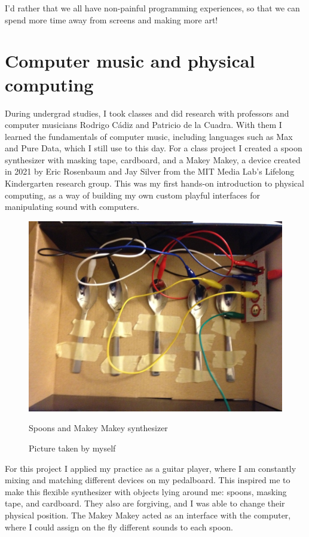 I'd rather that we all have non-painful programming experiences, so that we can spend more time away from screens and making more art!

\section{Computer music and physical computing}

During undergrad studies, I took classes and did research with professors and computer musicians Rodrigo Cádiz and Patricio de la Cuadra. With them I learned the fundamentals of computer music, including languages such as Max and Pure Data, which I still use to this day. For a class project I created a spoon synthesizer with masking tape, cardboard, and a Makey Makey, a device created in 2021 by Eric Rosenbaum and Jay Silver from the MIT Media Lab's Lifelong Kindergarten research group. This was my first hands-on introduction to physical computing, as a way of building my own custom playful interfaces for manipulating sound with computers.
 
\begin{figure}[ht]
  \centering
  \includegraphics[width=0.75\linewidth,height=0.25\textheight,keepaspectratio]{images/makey-makey-spoons.jpg}
  \caption{Spoons and Makey Makey synthesizer}
  \caption*{Picture taken by myself}
  \label{fig:makey-makey-spoons}
\end{figure}

For this project I applied my practice as a guitar player, where I am constantly mixing and matching different devices on my pedalboard. This inspired me to make this flexible synthesizer with objects lying around me: spoons, masking tape, and cardboard. They also are forgiving, and I was able to change their physical position. The Makey Makey acted as an interface with the computer, where I could assign on the fly different sounds to each spoon.

